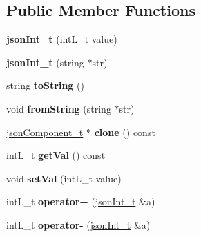 \subsection*{\-Public \-Member \-Functions}
\begin{DoxyCompactItemize}
\item 
\hypertarget{classjsonInt__t_a360fec86471df4df003697821aa8ce37}{{\bfseries json\-Int\-\_\-t} (int\-L\-\_\-t value)}\label{classjsonInt__t_a360fec86471df4df003697821aa8ce37}

\item 
\hypertarget{classjsonInt__t_afb559f6f7705eb6fc5920eba1d84f481}{{\bfseries json\-Int\-\_\-t} (string $\ast$str)}\label{classjsonInt__t_afb559f6f7705eb6fc5920eba1d84f481}

\item 
\hypertarget{classjsonInt__t_a9335287a5c0915b4b859a483dbbc7096}{string {\bfseries to\-String} ()}\label{classjsonInt__t_a9335287a5c0915b4b859a483dbbc7096}

\item 
\hypertarget{classjsonInt__t_af6c229dc339c8778f980048a21c53f1e}{void {\bfseries from\-String} (string $\ast$str)}\label{classjsonInt__t_af6c229dc339c8778f980048a21c53f1e}

\item 
\hypertarget{classjsonInt__t_a58368ad1fe962ae5444f69077906f522}{\hyperlink{classjsonComponent__t}{json\-Component\-\_\-t} $\ast$ {\bfseries clone} () const }\label{classjsonInt__t_a58368ad1fe962ae5444f69077906f522}

\item 
\hypertarget{classjsonInt__t_ad8b37dc411dff683f8246f4e41c6066a}{int\-L\-\_\-t {\bfseries get\-Val} () const }\label{classjsonInt__t_ad8b37dc411dff683f8246f4e41c6066a}

\item 
\hypertarget{classjsonInt__t_a2b3f4ebfe9b69f63bd612b98a3c53efb}{void {\bfseries set\-Val} (int\-L\-\_\-t value)}\label{classjsonInt__t_a2b3f4ebfe9b69f63bd612b98a3c53efb}

\item 
\hypertarget{classjsonInt__t_a54853e517e9d4ab4127e90a1b449846d}{int\-L\-\_\-t {\bfseries operator+} (\hyperlink{classjsonInt__t}{json\-Int\-\_\-t} \&a)}\label{classjsonInt__t_a54853e517e9d4ab4127e90a1b449846d}

\item 
\hypertarget{classjsonInt__t_a7c8c9451c16ef0b41a7175c93316f28d}{int\-L\-\_\-t {\bfseries operator-\/} (\hyperlink{classjsonInt__t}{json\-Int\-\_\-t} \&a)}\label{classjsonInt__t_a7c8c9451c16ef0b41a7175c93316f28d}


\end{DoxyCompactItemize}
